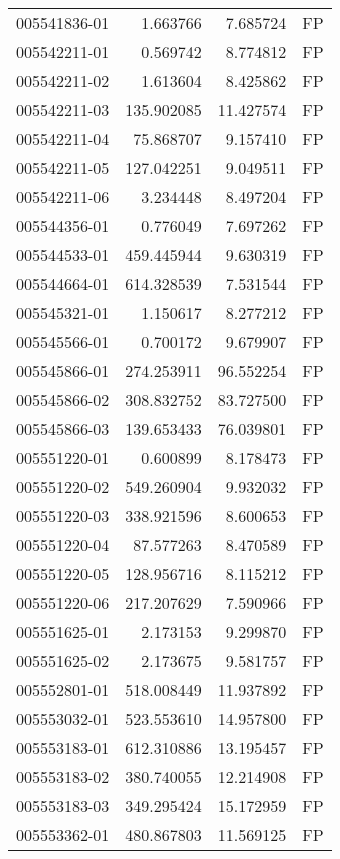 \begin{tabular}{lrrl}
005541836-01 &    1.663766 &     7.685724 &   FP \\
005542211-01 &    0.569742 &     8.774812 &   FP \\
005542211-02 &    1.613604 &     8.425862 &   FP \\
005542211-03 &  135.902085 &    11.427574 &   FP \\
005542211-04 &   75.868707 &     9.157410 &   FP \\
005542211-05 &  127.042251 &     9.049511 &   FP \\
005542211-06 &    3.234448 &     8.497204 &   FP \\
005544356-01 &    0.776049 &     7.697262 &   FP \\
005544533-01 &  459.445944 &     9.630319 &   FP \\
005544664-01 &  614.328539 &     7.531544 &   FP \\
005545321-01 &    1.150617 &     8.277212 &   FP \\
005545566-01 &    0.700172 &     9.679907 &   FP \\
005545866-01 &  274.253911 &    96.552254 &   FP \\
005545866-02 &  308.832752 &    83.727500 &   FP \\
005545866-03 &  139.653433 &    76.039801 &   FP \\
005551220-01 &    0.600899 &     8.178473 &   FP \\
005551220-02 &  549.260904 &     9.932032 &   FP \\
005551220-03 &  338.921596 &     8.600653 &   FP \\
005551220-04 &   87.577263 &     8.470589 &   FP \\
005551220-05 &  128.956716 &     8.115212 &   FP \\
005551220-06 &  217.207629 &     7.590966 &   FP \\
005551625-01 &    2.173153 &     9.299870 &   FP \\
005551625-02 &    2.173675 &     9.581757 &   FP \\
005552801-01 &  518.008449 &    11.937892 &   FP \\
005553032-01 &  523.553610 &    14.957800 &   FP \\
005553183-01 &  612.310886 &    13.195457 &   FP \\
005553183-02 &  380.740055 &    12.214908 &   FP \\
005553183-03 &  349.295424 &    15.172959 &   FP \\
005553362-01 &  480.867803 &    11.569125 &   FP \\

\end{tabular}
